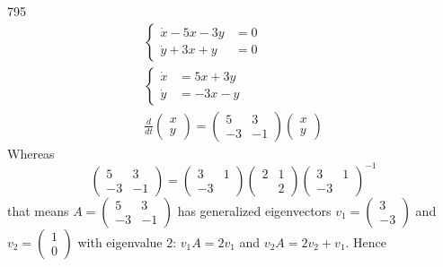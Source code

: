 \documentclass[12pt,a4paper]{article}
\begin{document}
    \begin{problem}{795}
        \begin{gather*}
            \left\{
                \begin{aligned}
                    \dot{x} - 5x - 3y &= 0\\
                    \dot{y} + 3x + y &= 0
                \end{aligned}
            \right.\\
            \left\{
                \begin{aligned}
                    \dot{x} &= 5x + 3y\\
                    \dot{y} &= -3x - y
                \end{aligned}
            \right.\\
            \frac{d}{dt}
            \begin{pmatrix}
                x\\
                y
            \end{pmatrix}
            =
            \begin{pmatrix}
                5& 3\\
                -3& -1
            \end{pmatrix}
            \begin{pmatrix}
                x\\
                y
            \end{pmatrix}
        \end{gather*}
        Whereas
        \[
            \begin{pmatrix}
                5& 3\\
                -3& -1
            \end{pmatrix}
            =
            \begin{pmatrix}
                3& 1\\
                -3&
            \end{pmatrix}
            \begin{pmatrix}
                2&1\\
                &2
            \end{pmatrix}
            \begin{pmatrix}
                3& 1\\
                -3&
            \end{pmatrix}^{-1}
        \]
        that means $A = (\begin{smallmatrix}5& 3\\-3& -1\end{smallmatrix})$ has generalized eigenvectors $v_1 = (\begin{smallmatrix}3\\-3\end{smallmatrix})$ and $v_2 = (\begin{smallmatrix}1\\0\end{smallmatrix})$ with eigenvalue $2$: $v_1 A = 2 v_1$ and $v_2 A = 2 v_2 + v_1$. Hence

\end{problem}
\end{document}
